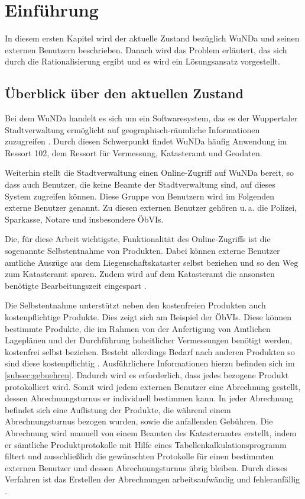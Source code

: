 \chapter{Einführung}
In diesem ersten Kapitel wird der aktuelle Zustand bezüglich \acs{WuNDa} und seinen externen Benutzern beschrieben. Danach wird das Problem erläutert, das sich durch die Rationalisierung ergibt und es wird ein Lösungsansatz vorgestellt.

\section{Überblick über den aktuellen Zustand}
Bei dem \ac{WuNDa} handelt es sich um ein Softwaresystem, das es der Wuppertaler Stadtverwaltung ermöglicht auf geographisch-räumliche Informationen zuzugreifen \autocite[vgl.][]{cismet-wunda}. Durch diesen Schwerpunkt findet \ac{WuNDa} häufig Anwendung im Ressort 102, dem Ressort für Vermessung, Katasteramt und Geodaten.

Weiterhin stellt die Stadtverwaltung einen Online-Zugriff auf \ac{WuNDa} bereit, so dass auch Benutzer, die keine Beamte der Stadtverwaltung sind, auf dieses System zugreifen können. Diese Gruppe von Benutzern wird im Folgenden externe Benutzer genannt.
Zu diesen externen Benutzer gehören u.\,a. die Polizei, Sparkasse, Notare und insbesondere \acp{ÖbVI}.

Die, für diese Arbeit wichtigste, Funktionalität des Online-Zugriffs ist die sogenannte Selbstentnahme von Produkten. Dabei können externe Benutzer amtliche Auszüge aus dem Liegenschaftskataster selbst beziehen und so den Weg zum Katasteramt sparen. Zudem wird auf dem Katasteramt die ansonsten benötigte Bearbeitungszeit eingespart \autocite[vgl.][]{wupp-wunda}.

Die Selbstentnahme unterstützt neben den kostenfreien Produkten auch kostenpflichtige Produkte. 
Dies zeigt sich am Beispiel der \acp{ÖbVI}. Diese können bestimmte Produkte, die im Rahmen von der Anfertigung von Amtlichen Lageplänen und der Durchführung hoheitlicher Vermessungen benötigt werden, kostenfrei selbst beziehen.
Besteht allerdings Bedarf nach anderen Produkten so sind diese kostenpflichtig \autocite[vgl.][]{wupp-wunda-oebvi}. Ausführlichere Informationen hierzu befinden sich im \autoref{subsec:gebuehren}.
Dadurch wird es erforderlich, dass jedes bezogene Produkt protokolliert wird.
Somit wird jedem externen Benutzer eine Abrechnung gestellt, dessen Abrechnungsturnus er individuell bestimmen kann.
In jeder Abrechnung befindet sich eine Auflistung der Produkte, die während einem Abrechnungsturnus bezogen wurden, sowie die anfallenden Gebühren.
Die Abrechnung wird manuell von einem Beamten des Katasteramtes erstellt, indem er sämtliche Produktprotokolle mit Hilfe eines Tabellenkalkulationsprogramm filtert und ausschließlich die gewünschten Protokolle für einen bestimmten externen Benutzer und dessen Abrechnungsturnus übrig bleiben.
Durch dieses Verfahren ist das Erstellen der Abrechnungen arbeitsaufwändig und fehleranfällig \autocite[vgl.][]{sander-abrechnung}.


